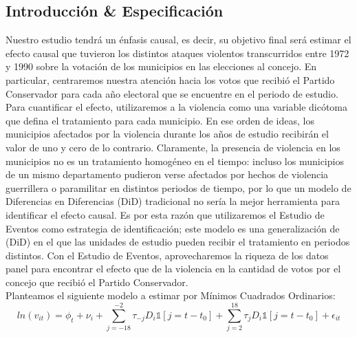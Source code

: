 \documentclass[a4paper]{article}
\begin{document}
\subsection{Introducción \& Especificación}
\begin{adjustwidth}{0.5}{0.5}


Nuestro estudio tendrá un énfasis causal, es decir, su objetivo final será estimar el efecto causal que tuvieron los distintos ataques violentos transcurridos entre 1972 y 1990 sobre la votación de los municipios en las elecciones al concejo. En particular, centraremos nuestra atención hacia los votos que recibió el Partido Conservador para cada año electoral que se encuentre en el periodo de estudio. Para cuantificar el efecto, utilizaremos a la violencia como una variable dicótoma que defina el tratamiento para cada municipio. En ese orden de ideas, los municipios afectados por la violencia durante los años de estudio recibirán el valor de uno y cero de lo contrario. Claramente, la presencia de violencia en los municipios no es un tratamiento homogéneo en el tiempo: incluso los municipios de un mismo departamento pudieron verse afectados por hechos de violencia guerrillera o paramilitar en distintos periodos de tiempo, por lo que un modelo de Diferencias en Diferencias (DiD) tradicional no sería la mejor herramienta para identificar el efecto causal. Es por esta razón que utilizaremos el  Estudio de Eventos como estrategia de identificación; este modelo es una generalización de (DiD) en el que las unidades de estudio pueden recibir el tratamiento en periodos distintos. Con el Estudio de Eventos, aprovecharemos la riqueza de los datos panel para encontrar el efecto que de la violencia en la cantidad de votos por el concejo que recibió el Partido Conservador. \\


Planteamos el siguiente modelo a estimar por Mínimos Cuadrados Ordinarios:
\begin{equation}
ln(v_{it})=\phi_t+\nu_i + \sum_{j=-18}^{-2}\tau_{-j}D_i\mathds{1}[j=t-t_0] + \sum_{j=2}^{18}\tau_{j}D_i\mathds{1}[j=t-t_0] + \epsilon_{it} 
\end{equation}


\end{adjustwidth}
\end{document}
